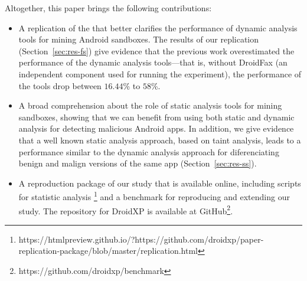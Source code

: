Altogether, this paper brings the following contributions:

\begin{itemize}
\item A replication of the \blls that better clarifies the performance of
  dynamic analysis tools for mining Android sandboxes. The results of
  our replication (Section~\ref{sec:res-fs})
  give evidence that the previous work overestimated
  the performance of the dynamic analysis tools---that is, without
  DroidFax (an independent component used for running the
  \blls experiment), the performance of the tools drop between $16.44$\% to $58$\%. 

\item A broad comprehension about the role of static analysis tools for mining
  sandboxes, showing that we can benefit from using both static and dynamic
  analysis for detecting malicious Android apps. In addition,
  we give evidence that a well known static analysis approach, based on
  taint analysis, leads to a performance similar to the dynamic analysis
  approach for diferenciating benign and malign versions of the same
  app (Section~\ref{sec:res-ss}).

\item A reproduction package of our study that is available online, including
  scripts for statistic analysis \footnote{https://htmlpreview.github.io/?https://github.com/droidxp/paper-replication-package/blob/master/replication.html}
  and a benchmark for reproducing and extending our study. The repository for DroidXP is available
at GitHub\footnote{https://github.com/droidxp/benchmark}.
 
\end{itemize}

